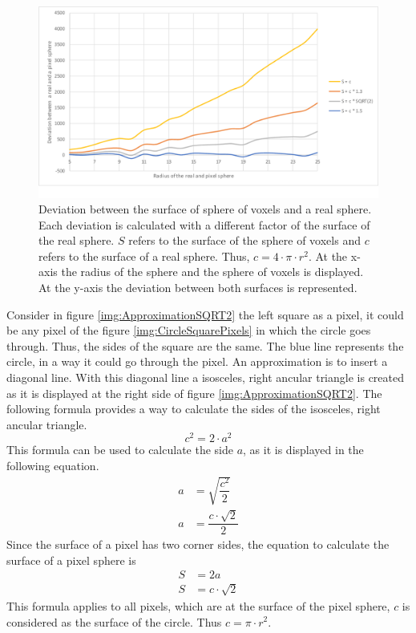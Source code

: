 \begin{figure}
	\center
	\includegraphics[scale=0.3]{figures/DeviationSphereToPixelSphere.png}
	\caption{Deviation between the surface of sphere of voxels and a real sphere. Each deviation is calculated with a different factor of the surface of the real sphere. $S$ refers to the surface of the sphere of voxels and $c$ refers to the surface of a real sphere. Thus, $c = 4 \cdot \pi \cdot r^{2}$. \newline
	At the x-axis the radius of the sphere and the sphere of voxels is displayed. At the y-axis the deviation between both surfaces is represented.}
	\label{img:DeviationSphere}
\end{figure}

Consider in figure \ref{img:ApproximationSQRT2} the left square as a pixel, it could be any pixel of the figure \ref{img:CircleSquarePixels} in which the circle goes through. Thus, the sides of the square are the same. The blue line represents the circle, in a way it could go through the pixel. An approximation is to insert a diagonal line. With this diagonal line a isosceles, right ancular triangle is created as it is displayed at the right side of figure \ref{img:ApproximationSQRT2}. \newline
The following formula provides a way to calculate the sides of the isosceles, right ancular triangle.
\begin{equation}\label{eq:IsoscelesRightAncularTriangle}
c^{2} = 2 \cdot a^{2}
\end{equation}
This formula can be used to calculate the side $a$, as it is displayed in the following equation.
\begin{equation}\label{eq:CornerSideAOfTriangle}
\begin{split}
a &= \sqrt{\dfrac{c^{2}}{2}} \\
a &= \dfrac{c \cdot \sqrt{2}}{2}
\end{split}
\end{equation}
Since the surface of a pixel has two corner sides, the equation to calculate the surface of a pixel sphere is
\begin{equation}\label{eq:PixelSurfaceCalculation}
\begin{split}
S &= 2a \\
S &= c \cdot \sqrt{2}
\end{split}
\end{equation}
This formula applies to all pixels, which are at the surface of the pixel sphere, $c$ is considered as the surface of the circle. Thus $c = \pi \cdot r^{2}$.

